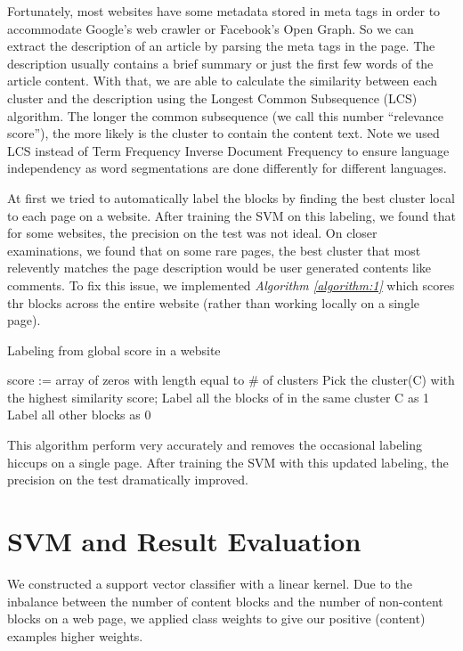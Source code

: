 \documentclass{acm_proc_article-sp}
\begin{document}
Fortunately, most websites have some metadata stored in meta tags in order to accommodate Google's web crawler or Facebook's Open Graph. So we can extract the description of an article by parsing the meta tags in the page. The description usually contains a brief summary or just the first few words of the article content. With that, we are able to calculate the similarity between each cluster and the description using the Longest Common Subsequence (LCS) algorithm. The longer the common subsequence (we call this number ``relevance score''), the more likely is the cluster to contain the content text. Note we used LCS instead of Term Frequency Inverse Document Frequency to ensure language independency as word segmentations are done differently for different languages.

At first we tried to automatically label the blocks by finding the best cluster local to each page on a website. After training the SVM on this labeling, we found that for some websites, the precision on the test was not ideal. On closer examinations, we found that on some rare pages, the best cluster that most relevently matches the page description would be user generated contents like comments. To fix this issue, we implemented \emph{Algorithm \ref{algorithm:1}} which scores thr blocks across the entire website (rather than working locally on a single page).

\begin{algorithm}
\label{algorithm:1}
\caption{Labeling from global score in a website}

 \SetLine
 score := {array of zeros with length equal to \# of clusters}\;
 Pick the cluster(C) with the highest similarity score;
 Label all the blocks of in the same cluster C as 1\;
 Label all other blocks as 0\;

\end{algorithm}

This algorithm perform very accurately and removes the occasional labeling hiccups on a single page. After training the SVM with this updated labeling, the precision on the test dramatically improved.

\section{SVM and Result Evaluation}

We constructed a support vector classifier with a linear kernel. Due to the inbalance between the number of content blocks and the number of non-content blocks on a web page, we applied class weights to give our positive (content) examples higher weights.
\end{document}

